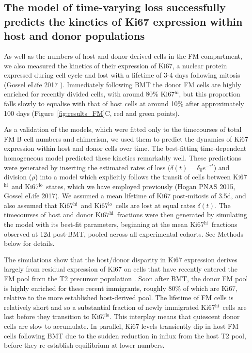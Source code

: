 \documentclass[11pt]{article}
\newcommand{\red}[1]{{\color{red}{#1}}}
\newcommand{\khi}{Ki67$^\text{hi}$}
\newcommand{\klo}{Ki67$^\text{lo}$}
\begin{document}
\subsection*{The model of time-varying loss successfully predicts the kinetics of Ki67 expression within host and donor populations}
As well as the numbers of host and donor-derived cells in the FM compartment, we  also measured the kinetics of their expression of Ki67, a nuclear protein expressed during cell cycle and lost with a lifetime of 3-4 days following mitosis (Gossel eLife 2017 \red{and others - see refs in that paper}). Immediately following BMT the donor FM cells are highly enriched for recently divided cells, with around 80\% \khi, but this proportion falls slowly to equalise with that of host cells at around 10\% after approximately 100 days (Figure~\ref{fig:results_FM}C, red and green points).

As a validation of the models,  which were fitted only to the timecourses of total FM B cell numbers and chimerism, we used them to predict the dynamics of Ki67 expression within host and donor cells over time. The best-fitting time-dependent homogeneous model  predicted these kinetics remarkably well. These predictions were generated by inserting the estimated rates of loss ($\delta(t) = \delta_{0} e^{-rt}$) and division ($\rho$) into a model which explicitly follows the transit of cells between \khi\ and \klo\ states, which we have employed previously (Hogan PNAS 2015, Gossel eLife 2017). We assumed a mean lifetime of Ki67 post-mitosis of 3.5d, and also assumed that \khi\ and \klo\ cells are lost at equal rates $\delta(t)$. The timecourses of host and donor \khi\ fractions were then generated by simulating the model with its best-fit parameters, beginning at the mean \khi\ fractions observed at 12d post-BMT, pooled across all experimental cohorts. See Methods below for details.

The simulations show that the host/donor disparity in Ki67 expression derives largely from residual expression of Ki67 on cells that have recently entered the FM pool from the T2 precursor population \red{T2s are not dividing, you say... so surely this is further evidence that T1s are the source for FMs?}.  Soon after BMT, the donor FM pool is highly enriched for these recent immigrants, roughly 80\% of which are Ki67,  relative to the more established host-derived pool. The lifetime of FM cells is relatively short and so a substantial fraction of newly immigrated \khi\ cells  are lost before they transition to \klo. This interplay means that quiescent donor cells are slow to accumulate. In parallel, Ki67 levels transiently dip in host FM cells following BMT due to the sudden reduction in influx from the host T2 pool, before they re-establish equilibrium at lower numbers. 
\end{document}
